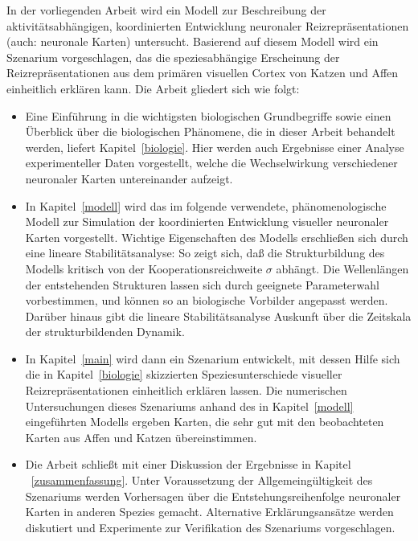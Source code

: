 In der vorliegenden Arbeit wird ein Modell zur Beschreibung der
aktivitätsabhängigen, koordinierten Entwicklung neuronaler
Reizrepräsentationen (auch: neuronale Karten) untersucht. Basierend auf
diesem Modell wird ein Szenarium vorgeschlagen, das die speziesabhängige
Erscheinung der Reizrepräsentationen aus dem primären visuellen Cortex
von Katzen und Affen einheitlich erklären kann. Die Arbeit gliedert sich
wie folgt:

\begin{itemize}
    \item Eine Einführung in die wichtigsten biologischen Grundbegriffe sowie
    einen Über\-blick über die biologischen Phänomene, die in dieser Arbeit
    behandelt werden, liefert Kapitel~\ref{biologie}. Hier werden auch
    Ergebnisse einer Analyse experimenteller Daten vorgestellt, welche die
    Wechselwirkung verschiedener neuronaler Karten untereinander aufzeigt.

    \item In Kapitel~\ref{modell} wird das im folgende verwendete,
    phänomenologische Modell zur Simulation der koordinierten Entwicklung
    visueller neuronaler Karten vorgestellt. Wichtige Eigenschaften des Modells
    erschließen sich durch eine lineare Stabilitätsanalyse: So zeigt sich,
    daß die Strukturbildung des Modells kritisch von der
    Kooperationsreichweite $\sigma$ abhängt. Die Wellenlängen der
    entstehenden Strukturen lassen sich durch geeignete Parameterwahl
    vorbestimmen, und können so an biologische Vorbilder angepasst werden.
    Darüber hinaus gibt die lineare Stabilitätsanalyse Auskunft über die
    Zeitskala der strukturbildenden Dynamik.

    \item In Kapitel~\ref{main} wird dann ein Szenarium entwickelt, mit dessen
    Hilfe sich die in Kapitel~\ref{biologie} skizzierten Speziesunterschiede
    visueller Reizrepräsentationen einheitlich erklären lassen. Die
    numerischen Untersuchungen dieses Szenariums anhand des in
    Kapitel~\ref{modell} eingeführten Modells ergeben Karten, die sehr gut mit
    den beobachteten Karten aus Affen und Katzen übereinstimmen.

    \item Die Arbeit schließt mit einer Diskussion der Ergebnisse in Kapitel
    ~\ref{zusammenfassung}. Unter Voraussetzung der Allgemeingültigkeit des
    Szenariums werden Vorhersagen über die Entstehungsreihenfolge neuronaler
    Karten in anderen Spezies gemacht. Alternative Erklärungsansätze werden
    diskutiert und Experimente zur Verifikation des Szenariums vorgeschlagen.
\end{itemize}
